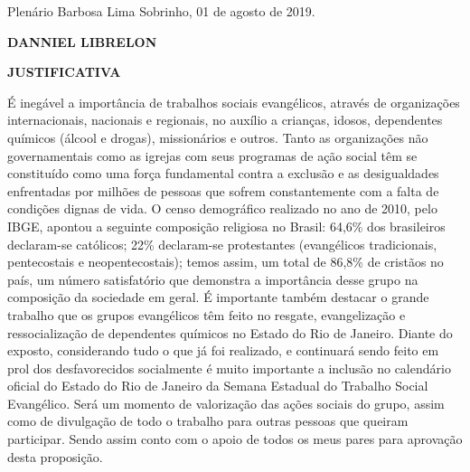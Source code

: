 \documentclass[10pt]{article}
\begin{document}
\begin{center}
  Plenário Barbosa Lima Sobrinho, 01 de agosto de 2019.

   \bigskip

  \textbf{ DANNIEL LIBRELON}

  \bigskip

  \textbf{JUSTIFICATIVA}
  \bigskip

\end{center}

  É inegável a importância de trabalhos sociais evangélicos, através de organizações internacionais, nacionais e regionais, no auxílio a crianças, idosos, dependentes químicos (álcool e drogas),  missionários e outros.
Tanto as organizações não governamentais como as igrejas com seus programas de ação social têm se constituído como uma força fundamental contra a exclusão e as desigualdades enfrentadas por milhões de pessoas que sofrem constantemente com a falta de condições dignas de vida.
O censo demográfico realizado no ano de 2010, pelo IBGE, apontou a seguinte composição religiosa no Brasil: 64,6\% dos brasileiros declaram-se católicos; 22\% declaram-se protestantes (evangélicos tradicionais, pentecostais e neopentecostais); temos assim, um total de 86,8\% de cristãos no país, um número satisfatório que demonstra a  importância desse grupo na composição da sociedade em geral.
É importante também destacar o grande trabalho que os grupos evangélicos têm feito no resgate, evangelização e ressocialização de dependentes químicos no Estado do Rio de Janeiro.
Diante do exposto, considerando tudo o que já foi realizado, e continuará sendo feito em prol dos desfavorecidos socialmente é muito importante a inclusão no calendário oficial do Estado do Rio de Janeiro da Semana Estadual do Trabalho Social Evangélico. Será um momento de valorização das ações sociais do grupo, assim como de divulgação de todo o trabalho para outras pessoas que queiram participar. Sendo assim conto com o apoio de todos os meus pares para aprovação desta proposição.



\iffalse
\begin{center}
  \textbf{REFERÊNCIAS}
\end{center}


\fi
\end{document}
